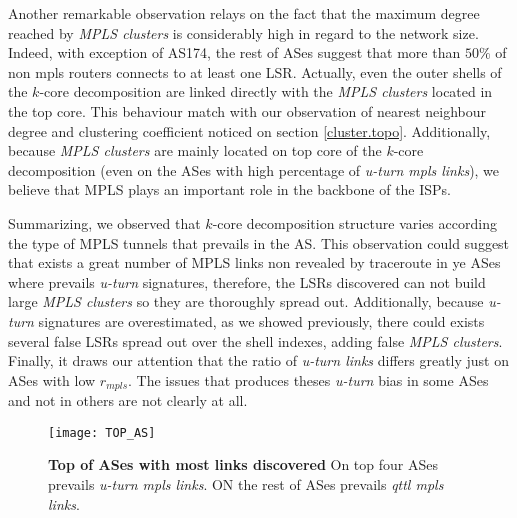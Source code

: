 Another remarkable observation  relays on the fact that the maximum degree reached by \textit{MPLS clusters} is considerably high in regard to the network size. Indeed, with exception of AS174, the rest of
ASes suggest that more than $50\%$ of non mpls routers connects to at
least one LSR. Actually, even the outer shells of the $k$-core decomposition are
linked directly with the \textit{MPLS clusters} located in the top core. This behaviour match with our observation of nearest neighbour degree and clustering coefficient noticed on section \ref{cluster.topo}. Additionally, because \textit{MPLS clusters} are mainly located on top core of the $k$-core decomposition (even on the ASes with high percentage of \textit{u-turn mpls links}), we believe that MPLS plays an important role in the backbone of the ISPs.

Summarizing, we observed that  $k$-core decomposition structure varies according the type of MPLS tunnels that prevails in the AS. This observation could suggest that exists a great number of MPLS links non revealed by traceroute in ye ASes where prevails \textit{u-turn} signatures, therefore, 
the LSRs discovered can not build large \textit{MPLS clusters} so they
are thoroughly spread out. Additionally, because \textit{u-turn} signatures are
overestimated, as we showed previously, there could exists several false LSRs
spread out over the shell indexes, adding false \textit{MPLS clusters}. Finally, it draws our attention that the ratio of \textit{u-turn links} differs greatly just on ASes with low $r_{mpls}$. The issues that produces theses \textit{u-turn} bias in some ASes and not in others are not clearly at all.


\begin{figure}[!htb]
\centering
\texttt{[image: TOP\_AS]}
\caption{\textbf{Top of ASes with most links discovered} On top four ASes prevails \textit{u-turn mpls links}. ON the rest of ASes prevails \textit{qttl mpls links}.}
\label{top_as}
\end{figure}

